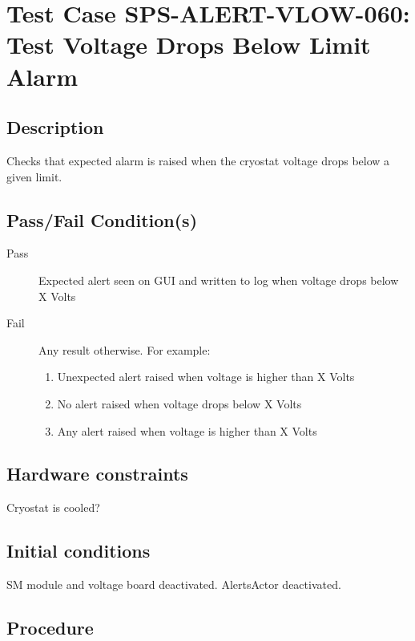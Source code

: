 \section{Test Case SPS-ALERT-VLOW-060: Test Voltage Drops Below Limit Alarm}

\subsection{Description}

Checks that expected alarm is raised when the cryostat voltage drops below a given limit.

\subsection{Pass/Fail Condition(s)}

\begin{description}
\item [Pass] Expected alert seen on GUI and written to log when voltage drops below X Volts
\item [Fail] Any result otherwise. For example:

\begin{enumerate}
    \item Unexpected alert raised when voltage is higher than X Volts
    \item No alert raised when voltage drops below X Volts
    \item Any alert raised when voltage is higher than X Volts
\end{enumerate}
\end{description}

\subsection{Hardware constraints}

Cryostat is cooled?

\subsection{Initial conditions}

SM module and voltage board deactivated. AlertsActor deactivated.

\subsection{Procedure}

